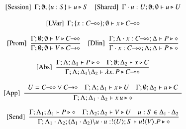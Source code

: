 \begin{figure}[t]
\[
	\begin{array}{c}
	\trule{Session}~~\Gamma; \emptyset; \set{u:S} \proves u \hastype S 
		\quad
		\trule{Shared}~~\Gamma \cat u : U; \emptyset; \emptyset \proves u \hastype U
\\[4mm]
	\trule{LVar}~~\Gamma; \set{x: \lhot{C}}; \emptyset \proves x \hastype \lhot{C}
		\\[4mm]

		\trule{Prom}~~\tree{
			\Gamma; \emptyset; \emptyset \proves V \hastype 
                         \lhot{C}
		}{
			\Gamma; \emptyset; \emptyset \proves V \hastype 
                         \shot{C}
		} 
		\quad
		\trule{Dlin}~~\tree{
		\Gamma; \Lambda \cat x : \lhot{C}; \Delta \proves P \hastype \Proc
		}{
			\Gamma \cat x:\shot{C}; \Lambda; \Delta \proves P \hastype \Proc
		}
		\\[6mm]


		\trule{Abs}~~\tree{
			\Gamma; \Lambda; \Delta_1 \proves P \hastype \Proc
			\quad
			\Gamma; \es; \Delta_2 \proves x \hastype C
		}{
			\Gamma; \Lambda; \Delta_1 \backslash \Delta_2 \proves \abs{{x}}{P} \hastype \lhot{{C}}
		}
		\\[6mm]

		\trule{App}~~\tree{
			\begin{array}{c}
				U = \lhot{C} \lor \shot{C}
				\quad
				\Gamma; \Lambda; \Delta_1 \proves x \hastype U
				\quad
				\Gamma; \es; \Delta_2 \proves u \hastype C
			\end{array}
		}{
			\Gamma; \Lambda; \Delta_1 \cat \Delta_2 \proves \appl{x}{u} \hastype \Proc
		} 
		\\[6mm]


		\trule{Send}~~\tree{
			\Gamma; \Lambda_1; \Delta_1 \proves P \hastype \Proc
			\quad
			\Gamma; \Lambda_2; \Delta_2 \proves V \hastype U
			\quad
			u:S \in \Delta_1 \cat \Delta_2
		}{
			\Gamma; \Lambda_1 \cat \Lambda_2; (\Delta_1 \cat \Delta_2) \backslash u \cat u:\btout{U} S \proves \bout{u}{V} P \hastype \Proc
		}
		\\[6mm]


\end{array}\]
\end{figure}
